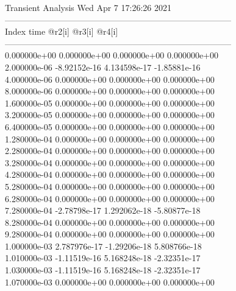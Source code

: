                                    Transient Analysis  Wed Apr  7 17:26:26  2021\\ \hline
--------------------------------------------------------------------------------\\ \hline
Index   time            @r2[i]          @r3[i]          @r4[i]          \\ \hline
--------------------------------------------------------------------------------\\ 	0.000000e+00	0.000000e+00	0.000000e+00	0.000000e+00	\\ 	2.000000e-06	-8.92152e-16	4.134598e-17	-1.85881e-16	\\ 	4.000000e-06	0.000000e+00	0.000000e+00	0.000000e+00	\\ 	8.000000e-06	0.000000e+00	0.000000e+00	0.000000e+00	\\ 	1.600000e-05	0.000000e+00	0.000000e+00	0.000000e+00	\\ 	3.200000e-05	0.000000e+00	0.000000e+00	0.000000e+00	\\ 	6.400000e-05	0.000000e+00	0.000000e+00	0.000000e+00	\\ 	1.280000e-04	0.000000e+00	0.000000e+00	0.000000e+00	\\ 	2.280000e-04	0.000000e+00	0.000000e+00	0.000000e+00	\\ 	3.280000e-04	0.000000e+00	0.000000e+00	0.000000e+00	\\ 	4.280000e-04	0.000000e+00	0.000000e+00	0.000000e+00	\\ 	5.280000e-04	0.000000e+00	0.000000e+00	0.000000e+00	\\ 	6.280000e-04	0.000000e+00	0.000000e+00	0.000000e+00	\\ 	7.280000e-04	-2.78798e-17	1.292062e-18	-5.80877e-18	\\ 	8.280000e-04	0.000000e+00	0.000000e+00	0.000000e+00	\\ 	9.280000e-04	0.000000e+00	0.000000e+00	0.000000e+00	\\ 	1.000000e-03	2.787976e-17	-1.29206e-18	5.808766e-18	\\ 	1.010000e-03	-1.11519e-16	5.168248e-18	-2.32351e-17	\\ 	1.030000e-03	-1.11519e-16	5.168248e-18	-2.32351e-17	\\ 	1.070000e-03	0.000000e+00	0.000000e+00	0.000000e+00	\\ \hline
